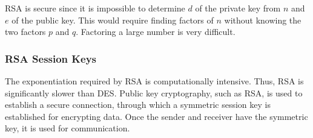 RSA is secure since it is impossible to determine \(d\) of the private key from \(n\) and \(e\) of the public key.
This would require finding factors of \(n\) without knowing the two factors \(p\) and \(q\).
Factoring a large number is very difficult.

\subsubsection{RSA Session Keys}

The exponentiation required by RSA is computationally intensive.
Thus, RSA is significantly slower than DES.
Public key cryptography, such as RSA, is used to establish a secure connection, through which a symmetric session key is established for encrypting data.
Once the sender and receiver have the symmetric key, it is used for communication.

